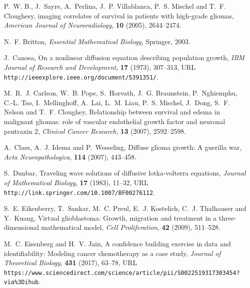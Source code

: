 \documentclass{aims}
\numberwithin{equation}{section}
\begin{document}
%
%

\providecommand{\href}[2]{#2}
\providecommand{\arxiv}[1]{\href{http://arxiv.org/abs/#1}{arXiv:#1}}
\providecommand{\url}[1]{\texttt{#1}}
\providecommand{\urlprefix}{URL }
\begin{thebibliography}{10}

\newblock P.~W. B., J.~Sayre, A.~Perlina, J.~P. Villablanca, P.~S. Mischel and
  T.~F. Cloughesy,
 imaging correlates of survival in patients with high-grade
  gliomas,
\newblock \emph{American Journal of Neuroradiology}, \textbf{10} (2005),
  2644--2474.

\newblock N.~F. Britton,
\newblock \emph{Essential Mathematical Biology},
\newblock Springer, 2003.

\newblock J.~Canosa,
\newblock On a nonlinear diffusion equation describing population growth,
\newblock \emph{IBM Journal of Research and Development}, \textbf{17} (1973),
  307--313,
\newblock \urlprefix\url{http://ieeexplore.ieee.org/document/5391351/}.

\newblock M.~R.~J. Carlson, W.~B. Pope, S.~Horvath, J.~G. Braunstein,
  P.~Nghiemphu, C.-L. Tso, I.~Mellinghoff, A.~Lai, L.~M. Liau, P.~S. Mischel,
  J.~Dong, S.~F. Nelson and T.~F. Cloughey,
\newblock Relationship between survival and edema in malignant gliomas: role of
  vascular endothelial growth factor and neuronal pentraxin 2,
\newblock \emph{Clinical Cancer Research}, \textbf{13} (2007), 2592--2598.

\newblock A.~Claes, A.~J. Idema and P.~Wesseling,
\newblock Diffuse glioma growth: A guerilla war,
\newblock \emph{Acta Neuropathologica}, \textbf{114} (2007), 443--458.

\newblock S.~Dunbar,
\newblock Traveling wave solutions of diffusive lotka-volterra equations,
\newblock \emph{Journal of Mathematical Biology}, \textbf{17} (1983), 11--32,
\newblock \urlprefix\url{http://link.springer.com/10.1007/BF00276112}.

\newblock S.~E. Eikenberry, T.~Sankar, M.~C. Preul, E.~J. Kostelich, C.~J.
  Thalhauser and Y.~Kuang,
\newblock Virtual glioblastoma: Growth, migration and treatment in a
  three-dimensional mathematical model,
\newblock \emph{Cell Proliferation}, \textbf{42} (2009), 511--528.

\newblock M.~C. Eisenberg and H.~V. Jain,
\newblock A confidence building exercise in data and identifiability: Modeling
  cancer chemotherapy as a case study,
\newblock \emph{Journal of Theoretical Biology}, \textbf{431} (2017), 63--78,
\newblock
  \urlprefix\url{https://www.sciencedirect.com/science/article/pii/S0022519317303454?via{\%}3Dihub}.


\end{thebibliography}
\end{document}
